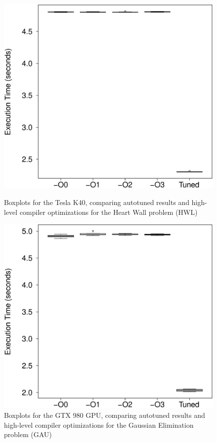 \begin{figure}[htpb]
    \centering
    \begin{minipage}{.48\textwidth}
        \centering
        \includegraphics[scale=.22]{./images/heartwall-0-Tesla-K40-Box.eps}
        \caption{Boxplots for the Tesla K40, comparing autotuned results and high-level compiler optimizations for the Heart Wall problem (HWL)}
        \label{fig:K40hwl}
    \end{minipage}%
    \hfill
    \begin{minipage}{.48\textwidth}
        \centering
        \includegraphics[scale=.22]{./images/gaussian-0-GTX-980-Box.eps}
        \caption{Boxplots for the GTX 980 GPU, comparing autotuned results and high-level compiler optimizations for the Gaussian Elimination problem (GAU)}
        \label{fig:980gau}
    \end{minipage}%
\end{figure}

